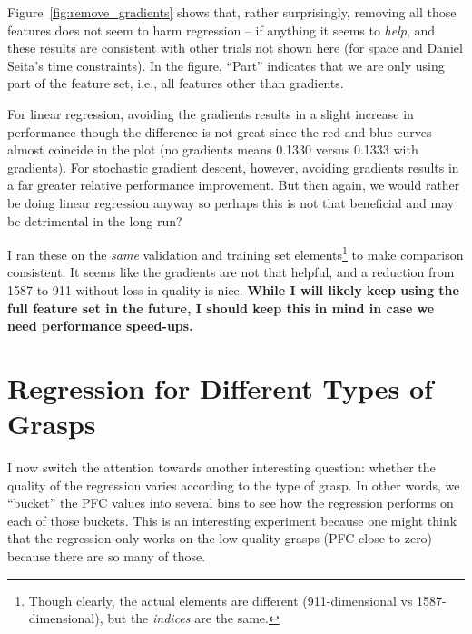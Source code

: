 \documentclass[a4paper, 11pt]{article}
\begin{document}
Figure~\ref{fig:remove_gradients} shows that, rather surprisingly, removing all those features does
not seem to harm regression -- if anything it seems to \emph{help}, and these results are consistent
with other trials not shown here (for space and Daniel Seita's time constraints). In the figure,
``Part'' indicates that we are only using part of the feature set, i.e., all features other than
gradients.

For linear regression, avoiding the gradients results in a slight increase in performance though the
difference is not great since the red and blue curves almost coincide in the plot (no gradients
means 0.1330 versus 0.1333 with gradients). For stochastic gradient descent, however, avoiding
gradients results in a far greater relative performance improvement. But then again, we would rather
be doing linear regression anyway so perhaps this is not that beneficial and may be detrimental in
the long run?

I ran these on the \emph{same} validation and training set elements\footnote{Though clearly, the
actual elements are different (911-dimensional vs 1587-dimensional), but the \emph{indices} are the
same.} to make comparison consistent. It seems like the gradients are not that helpful, and a
reduction from 1587 to 911 without loss in quality is nice. \textbf{While I will likely keep using
the full feature set in the future, I should keep this in mind in case we need performance
speed-ups.}



\section{Regression for Different Types of Grasps}

I now switch the attention towards another interesting question: whether the quality of the
regression varies according to the type of grasp. In other words, we ``bucket'' the PFC values into
several bins to see how the regression performs on each of those buckets. This is an interesting
experiment because one might think that the regression only works on the low quality grasps (PFC
close to zero) because there are so many of those.
\end{document}
